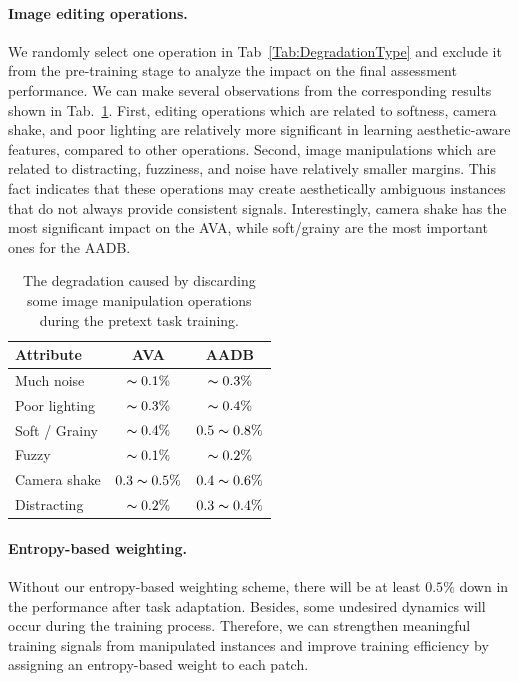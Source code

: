 \documentclass[letterpaper]{article}
\begin{document}
\paragraph{Image editing operations.}
We randomly select one operation in Tab~\ref{Tab:DegradationType} and exclude it from the pre-training stage to analyze the impact on the final assessment performance.
We can make several observations from the corresponding results shown in Tab.~\ref{tab:AblationStudyOfOperations}.
First, editing operations which are related to softness, camera shake, and poor lighting are relatively more significant in learning aesthetic-aware features, compared to other operations.
Second, image manipulations which are related to distracting, fuzziness, and noise have relatively smaller margins.
This fact indicates that these operations may create aesthetically ambiguous instances that do not always provide consistent signals.
Interestingly, camera shake has the most significant impact on the AVA, while soft/grainy are the most important ones for the AADB.

\begin{table}
    \centering
    \caption{The degradation caused by discarding some image manipulation operations during the pretext task training.}
    \label{tab:AblationStudyOfOperations}
        \begin{tabular}{l|c|c}
        \toprule
        Attribute & AVA & AADB \\
        \hline
        Much noise         & $\thicksim 0.1\%$ & $\thicksim 0.3\%$ \\
        Poor lighting       & $\thicksim 0.3\%$ & $\thicksim 0.4\%$ \\
        Soft / Grainy       & $\thicksim 0.4\%$ & $0.5 \thicksim 0.8\%$ \\
        Fuzzy                  & $\thicksim 0.1\%$ & $\thicksim 0.2\%$ \\
        Camera shake    & $0.3 \thicksim 0.5\%$ & $0.4 \thicksim 0.6\%$ \\
        Distracting           & $\thicksim 0.2\%$ & $0.3 \thicksim 0.4\%$ \\
        \bottomrule
    \end{tabular}
\end{table}

\paragraph{Entropy-based weighting.}
Without our entropy-based weighting scheme, there will be at least $0.5\%$ down in the performance after task adaptation.
Besides, some undesired dynamics will occur during the training process.
Therefore, we can strengthen meaningful training signals from manipulated instances and improve training efficiency by assigning an entropy-based weight to each patch.
\end{document}
